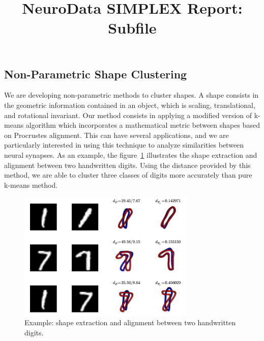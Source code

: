 \documentclass[simplex.tex]{subfiles}
\title{NeuroData SIMPLEX Report: Subfile}
\begin{document}

\subsection{Non-Parametric Shape Clustering}

We are developing non-parametric methods to cluster shapes. A shape
consists in the geometric information contained in an object, which
is scaling, translational, and rotational invariant. Our method consists
in applying a modified version of k-means algorithm which incorporates a
mathematical metric between shapes based on Procrustes alignment. This
can have several applications, and we are particularly interested in
using this technique to analyze similarities between neural synapses. As
an example, the figure~\ref{fig:nonparShape} illustrates the shape extraction and
alignment between two handwritten digits. Using the distance provided by
this method, we are able to cluster three classes of digits more
accurately than pure k-means method. 

\begin{figure}[h!]
\begin{cframed}
\centering
\includegraphics[width=0.75\textwidth]{./figs/nonparShape.png}
\caption{
 Example: shape extraction and alignment between two handwritten digits.
}
\label{fig:nonparShape}
\end{cframed}
\end{figure}
\end{document}
